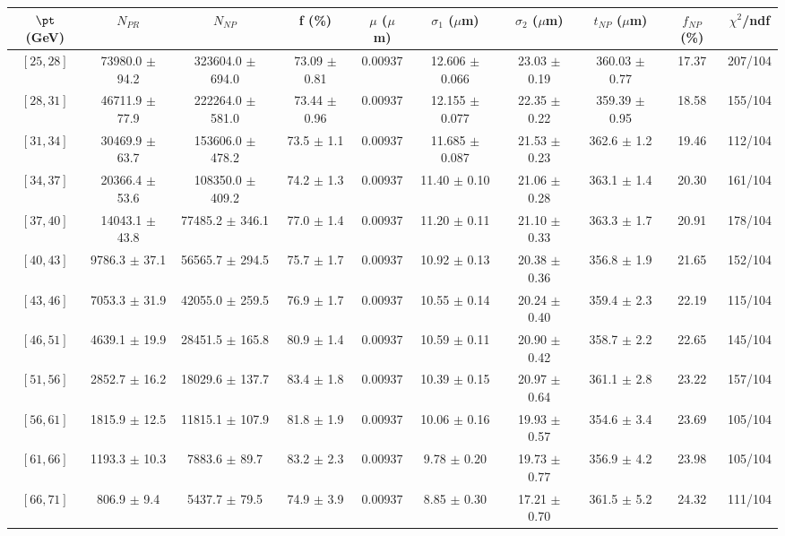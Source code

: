 \begin{tabular}{c||c|c|c|c|c|c|c||c|c}
$\pt$ (GeV) & $N_{PR}$ & $N_{NP}$ & f (\%) & $\mu$ ($\mu$m) & $\sigma_1$ ($\mu$m) & $\sigma_2$ ($\mu$m)  & $t_{NP}$ ($\mu$m) & $f_{NP}$ (\%) & $\chi^2$/ndf \\
\hline
$[25, 28]$ & 73980.0 $\pm$ 94.2 & 323604.0 $\pm$ 694.0 & 73.09 $\pm$ 0.81 & 0.00937 & 12.606 $\pm$ 0.066 & 23.03 $\pm$ 0.19 & 360.03 $\pm$ 0.77 & 17.37 & 207/104\\
$[28, 31]$ & 46711.9 $\pm$ 77.9 & 222264.0 $\pm$ 581.0 & 73.44 $\pm$ 0.96 & 0.00937 & 12.155 $\pm$ 0.077 & 22.35 $\pm$ 0.22 & 359.39 $\pm$ 0.95 & 18.58 & 155/104\\
$[31, 34]$ & 30469.9 $\pm$ 63.7 & 153606.0 $\pm$ 478.2 & 73.5 $\pm$ 1.1 & 0.00937 & 11.685 $\pm$ 0.087 & 21.53 $\pm$ 0.23 & 362.6 $\pm$ 1.2 & 19.46 & 112/104\\
$[34, 37]$ & 20366.4 $\pm$ 53.6 & 108350.0 $\pm$ 409.2 & 74.2 $\pm$ 1.3 & 0.00937 & 11.40 $\pm$ 0.10 & 21.06 $\pm$ 0.28 & 363.1 $\pm$ 1.4 & 20.30 & 161/104\\
$[37, 40]$ & 14043.1 $\pm$ 43.8 & 77485.2 $\pm$ 346.1 & 77.0 $\pm$ 1.4 & 0.00937 & 11.20 $\pm$ 0.11 & 21.10 $\pm$ 0.33 & 363.3 $\pm$ 1.7 & 20.91 & 178/104\\
$[40, 43]$ & 9786.3 $\pm$ 37.1 & 56565.7 $\pm$ 294.5 & 75.7 $\pm$ 1.7 & 0.00937 & 10.92 $\pm$ 0.13 & 20.38 $\pm$ 0.36 & 356.8 $\pm$ 1.9 & 21.65 & 152/104\\
$[43, 46]$ & 7053.3 $\pm$ 31.9 & 42055.0 $\pm$ 259.5 & 76.9 $\pm$ 1.7 & 0.00937 & 10.55 $\pm$ 0.14 & 20.24 $\pm$ 0.40 & 359.4 $\pm$ 2.3 & 22.19 & 115/104\\
$[46, 51]$ & 4639.1 $\pm$ 19.9 & 28451.5 $\pm$ 165.8 & 80.9 $\pm$ 1.4 & 0.00937 & 10.59 $\pm$ 0.11 & 20.90 $\pm$ 0.42 & 358.7 $\pm$ 2.2 & 22.65 & 145/104\\
$[51, 56]$ & 2852.7 $\pm$ 16.2 & 18029.6 $\pm$ 137.7 & 83.4 $\pm$ 1.8 & 0.00937 & 10.39 $\pm$ 0.15 & 20.97 $\pm$ 0.64 & 361.1 $\pm$ 2.8 & 23.22 & 157/104\\
$[56, 61]$ & 1815.9 $\pm$ 12.5 & 11815.1 $\pm$ 107.9 & 81.8 $\pm$ 1.9 & 0.00937 & 10.06 $\pm$ 0.16 & 19.93 $\pm$ 0.57 & 354.6 $\pm$ 3.4 & 23.69 & 105/104\\
$[61, 66]$ & 1193.3 $\pm$ 10.3 & 7883.6 $\pm$ 89.7 & 83.2 $\pm$ 2.3 & 0.00937 & 9.78 $\pm$ 0.20 & 19.73 $\pm$ 0.77 & 356.9 $\pm$ 4.2 & 23.98 & 105/104\\
$[66, 71]$ & 806.9 $\pm$ 9.4 & 5437.7 $\pm$ 79.5 & 74.9 $\pm$ 3.9 & 0.00937 & 8.85 $\pm$ 0.30 & 17.21 $\pm$ 0.70 & 361.5 $\pm$ 5.2 & 24.32 & 111/104\\

\end{tabular}

